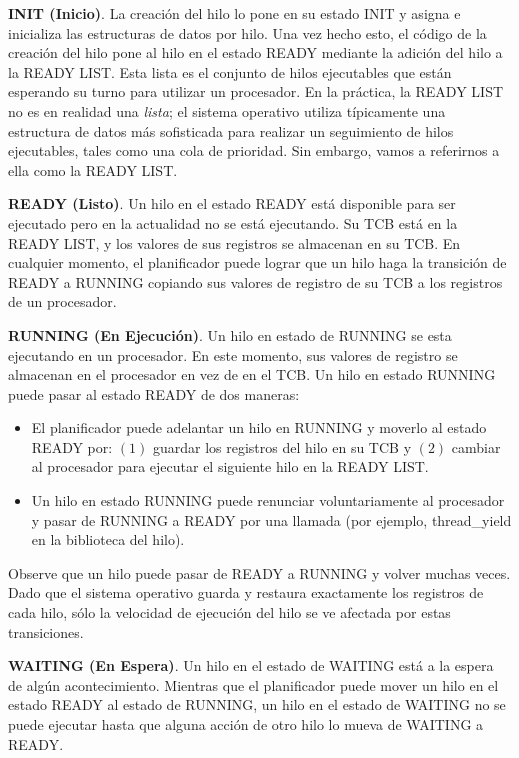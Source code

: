 \documentclass[10pt]{book}
\begin{document}
\textbf{INIT (Inicio)}. La creación del hilo lo pone en su estado INIT y asigna e inicializa las estructuras de datos por hilo. Una vez hecho esto, el código de la creación del hilo pone al hilo en el estado READY mediante la adición del hilo a la READY LIST. Esta lista es el conjunto de hilos ejecutables que están esperando su turno para utilizar un procesador. En la práctica, la READY LIST no es en realidad una \textit{lista}; el sistema operativo utiliza típicamente una estructura de datos más sofisticada para realizar un seguimiento de hilos ejecutables, tales como una cola de prioridad. Sin embargo, vamos a referirnos a ella como la READY LIST.

\textbf{READY (Listo)}. Un hilo en el estado READY está disponible para ser ejecutado pero en la actualidad no se está ejecutando. Su TCB está en la READY LIST, y los valores de sus registros se almacenan en su TCB. En cualquier momento, el planificador puede lograr que un hilo haga la transición de READY a RUNNING copiando sus valores de registro de su TCB a los registros de un procesador.

\textbf{RUNNING (En Ejecución)}. Un hilo en estado de RUNNING se esta ejecutando en un procesador. En este momento, sus valores de registro se almacenan en el procesador en vez de en el TCB. Un hilo en estado RUNNING puede pasar al estado READY de dos maneras:
\begin{itemize}
\item El planificador puede adelantar un hilo en RUNNING y moverlo al estado READY por: $(1)$ guardar los registros del hilo en su TCB y $(2)$ cambiar al procesador para ejecutar el siguiente hilo en la READY LIST.
\item Un hilo en estado RUNNING puede renunciar voluntariamente al procesador y pasar de RUNNING a READY por una llamada (por ejemplo, {\mf thread\_yield} en la biblioteca del hilo).
\end{itemize}

Observe que un hilo puede pasar de READY a RUNNING y volver muchas veces. Dado que el sistema operativo guarda y restaura exactamente los registros de cada hilo, sólo la velocidad de ejecución del hilo se ve afectada por estas transiciones.

\textbf{WAITING (En Espera)}. Un hilo en el estado de WAITING está a la espera de algún acontecimiento. Mientras que el planificador puede mover un hilo en el estado READY al estado de RUNNING, un hilo en el estado de WAITING no se puede ejecutar hasta que alguna acción de otro hilo lo mueva de WAITING a READY.
\end{document}
